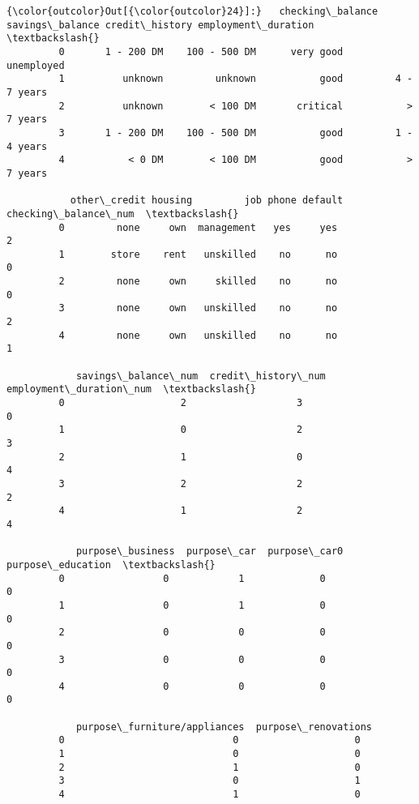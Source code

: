 \documentclass[11pt]{article}
\begin{document}
\begin{Verbatim}[commandchars=\\\{\}]
{\color{outcolor}Out[{\color{outcolor}24}]:}   checking\_balance savings\_balance credit\_history employment\_duration  \textbackslash{}
         0       1 - 200 DM    100 - 500 DM      very good          unemployed   
         1          unknown         unknown           good         4 - 7 years   
         2          unknown        < 100 DM       critical           > 7 years   
         3       1 - 200 DM    100 - 500 DM           good         1 - 4 years   
         4           < 0 DM        < 100 DM           good           > 7 years   
         
           other\_credit housing         job phone default  checking\_balance\_num  \textbackslash{}
         0         none     own  management   yes     yes                     2   
         1        store    rent   unskilled    no      no                     0   
         2         none     own     skilled    no      no                     0   
         3         none     own   unskilled    no      no                     2   
         4         none     own   unskilled    no      no                     1   
         
            savings\_balance\_num  credit\_history\_num  employment\_duration\_num  \textbackslash{}
         0                    2                   3                        0   
         1                    0                   2                        3   
         2                    1                   0                        4   
         3                    2                   2                        2   
         4                    1                   2                        4   
         
            purpose\_business  purpose\_car  purpose\_car0  purpose\_education  \textbackslash{}
         0                 0            1             0                  0   
         1                 0            1             0                  0   
         2                 0            0             0                  0   
         3                 0            0             0                  0   
         4                 0            0             0                  0   
         
            purpose\_furniture/appliances  purpose\_renovations  
         0                             0                    0  
         1                             0                    0  
         2                             1                    0  
         3                             0                    1  
         4                             1                    0  
\end{Verbatim}
            
\end{document}
